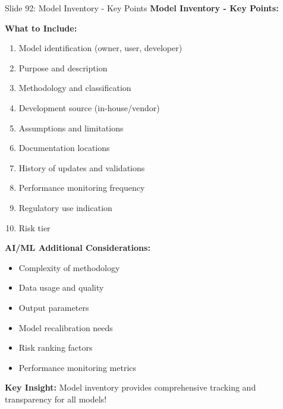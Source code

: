 \documentclass[8pt]{beamer}
\begin{document}
	\begin{frame}{Slide 92: Model Inventory - Key Points}
		\fontsize{6.5}{7.5}\selectfont
		\textbf{Model Inventory - Key Points:}
		
		\vspace{0.1cm}
		\textbf{What to Include:}
		\begin{enumerate}
			\item Model identification (owner, user, developer)
			\item Purpose and description
			\item Methodology and classification
			\item Development source (in-house/vendor)
			\item Assumptions and limitations
			\item Documentation locations
			\item History of updates and validations
			\item Performance monitoring frequency
			\item Regulatory use indication
			\item Risk tier
		\end{enumerate}
		
		\vspace{0.1cm}
		\textbf{AI/ML Additional Considerations:}
		\begin{itemize}
			\item Complexity of methodology
			\item Data usage and quality
			\item Output parameters
			\item Model recalibration needs
			\item Risk ranking factors
			\item Performance monitoring metrics
		\end{itemize}
		
		\textcolor{myblue}{\textbf{Key Insight:}} Model inventory provides \textcolor{myblue}{comprehensive tracking and transparency} for all models!
	\end{frame}
	
\end{document}
